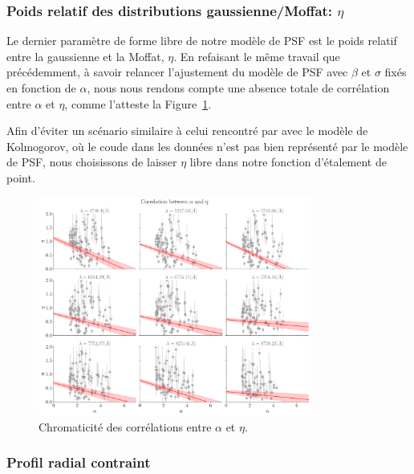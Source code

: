 \documentclass[../main/main.tex]{subfiles}
\begin{document}

\subsubsection{Poids relatif des distributions gaussienne/Moffat:
$\eta$}

Le dernier paramètre de forme libre de notre modèle de PSF est le poids
relatif entre la gaussienne et la Moffat, $\eta$. En refaisant le même
travail que précédemment, à savoir relancer l'ajustement du modèle de
PSF avec $\beta$ et $\sigma$ fixés en fonction de $\alpha$, nous nous
rendons compte une absence totale de corrélation entre $\alpha$ et
$\eta$, comme l'atteste la Figure~\ref{fig:alphaetachromcorr}.

Afin d'éviter un scénario similaire à celui rencontré par
\citet{Butonthese} avec le modèle de Kolmogorov, où le coude dans les données n'est pas
bien représenté par le modèle de PSF, nous choisissons de laisser $\eta$
libre dans notre fonction d'étalement de point.

\begin{figure}[ht]
  \centering
  \includegraphics[width=0.8\textwidth]{../figures/06_irf/STD_alpha_eta_chromatic_corr.pdf}
  \caption[Chromaticité des corrélations entre $\alpha$ et $\eta$]{Chromaticité des corrélations entre $\alpha$ et $\eta$.}
  \label{fig:alphaetachromcorr}
\end{figure}

\subsubsection{Profil radial contraint}
\end{document}
